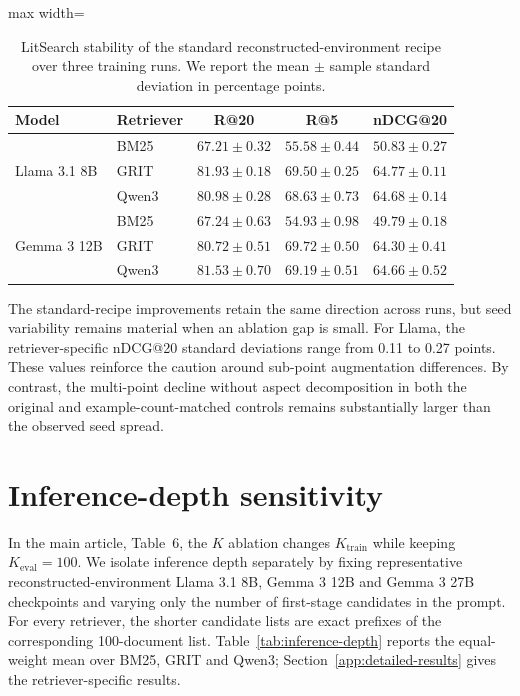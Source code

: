 \documentclass[pdflatex,sn-basic,Numbered]{sn-jnl}%
\theoremstyle{thmstyleone}%
\theoremstyle{thmstyletwo}%
\theoremstyle{thmstylethree}%
\begin{document}
\begin{table}[ht]


\centering
\footnotesize
\setlength{\tabcolsep}{3.5pt}
\renewcommand{\arraystretch}{1.08}
\begin{adjustbox}{max width=\linewidth}
\begin{tabular}{l l c c c}
\hline
Model & Retriever & R@20 & R@5 & nDCG@20 \\
\hline
\multirow{3}{*}{Llama 3.1 8B}
 & BM25  & $67.21\pm0.32$ & $55.58\pm0.44$ & $50.83\pm0.27$ \\
 & GRIT  & $81.93\pm0.18$ & $69.50\pm0.25$ & $64.77\pm0.11$ \\
 & Qwen3 & $80.98\pm0.28$ & $68.63\pm0.73$ & $64.68\pm0.14$ \\
\hline
\multirow{3}{*}{Gemma 3 12B}
 & BM25  & $67.24\pm0.63$ & $54.93\pm0.98$ & $49.79\pm0.18$ \\
 & GRIT  & $80.72\pm0.51$ & $69.72\pm0.50$ & $64.30\pm0.41$ \\
 & Qwen3 & $81.53\pm0.70$ & $69.19\pm0.51$ & $64.66\pm0.52$ \\
\hline
\end{tabular}
\end{adjustbox}


\caption{LitSearch stability of the standard reconstructed-environment recipe over
three training runs. We report the mean $\pm$ sample standard deviation in
percentage points.}
\label{tab:seed-stability}
\end{table}

The standard-recipe improvements retain the same direction across runs, but
seed variability remains material when an ablation gap is small. For Llama,
the retriever-specific nDCG@20 standard deviations range from 0.11 to 0.27
points. These values reinforce the caution around sub-point augmentation
differences. By contrast, the multi-point decline without aspect decomposition
in both the original and example-count-matched controls remains substantially
larger than the observed seed spread.

\FloatBarrier
\section{Inference-depth sensitivity}
\label{supp:depth}

\label{sec:list-length-mismatch}

In the main article, Table~6, the $K$ ablation changes
$K_{\mathrm{train}}$ while keeping $K_{\mathrm{eval}}=100$. We isolate inference
depth separately by fixing representative reconstructed-environment Llama 3.1
8B, Gemma 3 12B and Gemma 3 27B checkpoints and varying only the number of first-stage
candidates in the prompt. For every retriever, the shorter candidate lists are
exact prefixes of the corresponding 100-document list. Table~\ref{tab:inference-depth}
reports the equal-weight mean over BM25, GRIT and Qwen3; Section~\ref{app:detailed-results}
gives the retriever-specific results.
\end{document}
